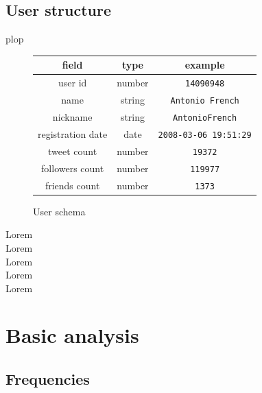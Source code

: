 \documentclass[a4paper,12pt]{report}
\begin{document}
\subsection{User structure}
plop
\begin{figure}[h!]
\centering
\begin{tabular}{c|c|c}
field & type & example\\
\midrule
user id & number & \texttt{14090948} \\ \hline
name & string & \texttt{Antonio French} \\ \hline
nickname & string & \texttt{AntonioFrench} \\ \hline
registration date & date & \texttt{2008-03-06 19:51:29} \\ \hline
tweet count & number & \texttt{19372} \\ \hline
followers count & number & \texttt{119977} \\ \hline
friends count & number & \texttt{1373} \\ \hline
\end{tabular}
\caption{User schema}
\end{figure}
Lorem\\
Lorem\\
Lorem\\
Lorem\\
Lorem\\


\newpage

\section{Basic analysis}

\subsection{Frequencies}
\end{document}
